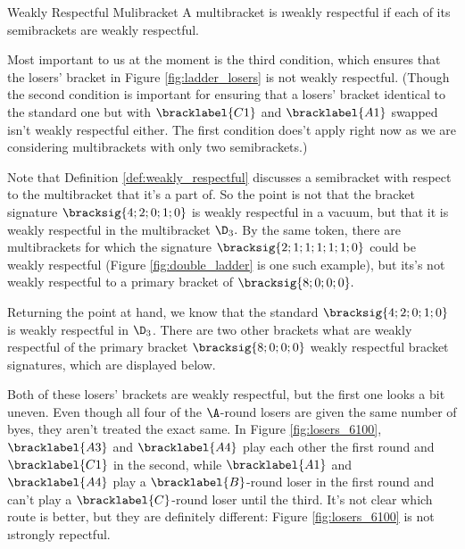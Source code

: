 {    \begin{definition}{Weakly Respectful Mulibracket}{}
        A multibracket is \i{weakly respectful} if each of its semibrackets are weakly respectful.
    \end{definition}


    Most important to us at the moment is the third condition, which ensures that the losers' bracket in Figure \ref{fig:ladder_losers} is not weakly respectful. (Though the second condition is important for ensuring that a losers' bracket identical to the standard one but with $\bracklabel{C1}$ and $\bracklabel{A1}$ swapped isn't weakly respectful either. The first condition does't apply right now as we are considering multibrackets with only two semibrackets.)

    Note that Definition \ref{def:weakly_respectful} discusses a semibracket with respect to the multibracket that it's a part of. So the point is not that the bracket signature $\bracksig{4;2;0;1;0}$ is weakly respectful in a vacuum, but that it is weakly respectful in the multibracket $\D_3.$ By the same token, there are multibrackets for which the signature $\bracksig{2;1;1;1;1;1;0}$ could be weakly respectful (Figure \ref{fig:double_ladder} is one such example), but its's not weakly respectful to a primary bracket of $\bracksig{8;0;0;0}.$


    Returning the point at hand, we know that the standard $\bracksig{4;2;0;1;0}$ is weakly respectful in $\D_3$. There are two other brackets what are weakly respectful of the primary bracket $\bracksig{8;0;0;0}$ weakly respectful bracket signatures, which are displayed below.


    Both of these losers' brackets are weakly respectful, but the first one looks a bit uneven. Even though all four of the $\A$-round losers are given the same number of byes, they aren't treated the exact same. In Figure \ref{fig:losers_6100}, $\bracklabel{A3}$ and $\bracklabel{A4}$ play each other the first round and $\bracklabel{C1}$ in the second, while $\bracklabel{A1}$ and $\bracklabel{A4}$ play a $\bracklabel{B}$-round loser in the first round and can't play a $\bracklabel{C}$-round loser until the third. It's not clear which route is better, but they are definitely different: Figure \ref{fig:losers_6100} is not \i{strongly repectful}.

}
